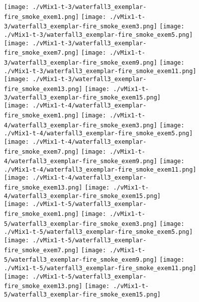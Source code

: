 \begin{figure}[ht!]
{\vspace{1mm}
    \texttt{[image: ./vMix1-t-3/waterfall3\_exemplar-fire\_smoke\_exem1.png]}
    \texttt{[image: ./vMix1-t-3/waterfall3\_exemplar-fire\_smoke\_exem3.png]}
    \texttt{[image: ./vMix1-t-3/waterfall3\_exemplar-fire\_smoke\_exem5.png]}
    \texttt{[image: ./vMix1-t-3/waterfall3\_exemplar-fire\_smoke\_exem7.png]}
    \texttt{[image: ./vMix1-t-3/waterfall3\_exemplar-fire\_smoke\_exem9.png]}
    \texttt{[image: ./vMix1-t-3/waterfall3\_exemplar-fire\_smoke\_exem11.png]}
    \texttt{[image: ./vMix1-t-3/waterfall3\_exemplar-fire\_smoke\_exem13.png]}
    \texttt{[image: ./vMix1-t-3/waterfall3\_exemplar-fire\_smoke\_exem15.png]} \\
\vspace{1mm}
    \texttt{[image: ./vMix1-t-4/waterfall3\_exemplar-fire\_smoke\_exem1.png]}
    \texttt{[image: ./vMix1-t-4/waterfall3\_exemplar-fire\_smoke\_exem3.png]}
    \texttt{[image: ./vMix1-t-4/waterfall3\_exemplar-fire\_smoke\_exem5.png]}
    \texttt{[image: ./vMix1-t-4/waterfall3\_exemplar-fire\_smoke\_exem7.png]}
    \texttt{[image: ./vMix1-t-4/waterfall3\_exemplar-fire\_smoke\_exem9.png]}
    \texttt{[image: ./vMix1-t-4/waterfall3\_exemplar-fire\_smoke\_exem11.png]}
    \texttt{[image: ./vMix1-t-4/waterfall3\_exemplar-fire\_smoke\_exem13.png]}
    \texttt{[image: ./vMix1-t-4/waterfall3\_exemplar-fire\_smoke\_exem15.png]} \\
\vspace{1mm}
    \texttt{[image: ./vMix1-t-5/waterfall3\_exemplar-fire\_smoke\_exem1.png]}
    \texttt{[image: ./vMix1-t-5/waterfall3\_exemplar-fire\_smoke\_exem3.png]}
    \texttt{[image: ./vMix1-t-5/waterfall3\_exemplar-fire\_smoke\_exem5.png]}
    \texttt{[image: ./vMix1-t-5/waterfall3\_exemplar-fire\_smoke\_exem7.png]}
    \texttt{[image: ./vMix1-t-5/waterfall3\_exemplar-fire\_smoke\_exem9.png]}
    \texttt{[image: ./vMix1-t-5/waterfall3\_exemplar-fire\_smoke\_exem11.png]}
    \texttt{[image: ./vMix1-t-5/waterfall3\_exemplar-fire\_smoke\_exem13.png]}
    \texttt{[image: ./vMix1-t-5/waterfall3\_exemplar-fire\_smoke\_exem15.png]} \\
}
\end{figure}
